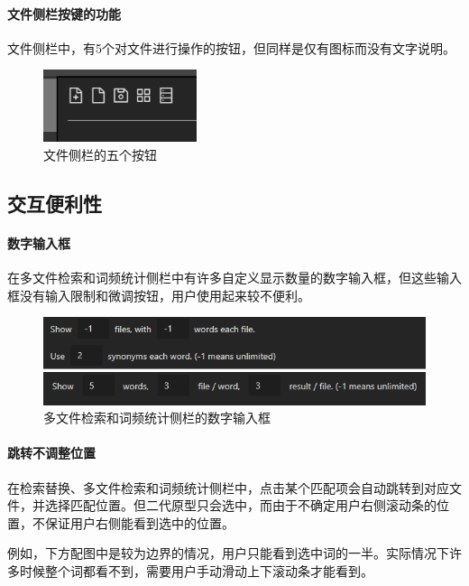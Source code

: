 \documentclass[scheme = chinese]{ctexart}
\begin{document}
\paragraph{文件侧栏按键的功能}
文件侧栏中，有5个对文件进行操作的按钮，但同样是仅有图标而没有文字说明。

\begin{figure}[h]
    \centering
    \includegraphics[width=0.4\textwidth]{images/问题-文件侧栏按钮.png}
    \caption{文件侧栏的五个按钮}
\end{figure}

\subsection{交互便利性}
\paragraph{数字输入框}
在多文件检索和词频统计侧栏中有许多自定义显示数量的数字输入框，但这些输入框没有输入限制和微调按钮，用户使用起来较不便利。

\begin{figure}[h]
    \centering
    \includegraphics[width=\textwidth]{images/问题-数字输入框.png}
    \caption{多文件检索和词频统计侧栏的数字输入框}
\end{figure}

\clearpage

\paragraph{跳转不调整位置}
在检索替换、多文件检索和词频统计侧栏中，点击某个匹配项会自动跳转到对应文件，并选择匹配位置。但二代原型只会选中，而由于不确定用户右侧滚动条的位置，不保证用户右侧能看到选中的位置。

例如，下方配图中是较为边界的情况，用户只能看到选中词的一半。实际情况下许多时候整个词都看不到，需要用户手动滑动上下滚动条才能看到。
\end{document}
